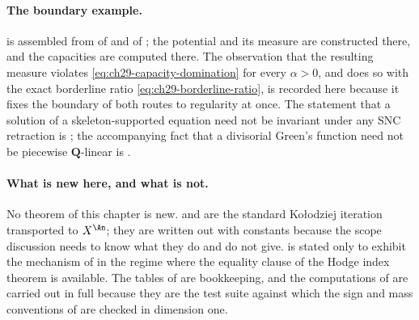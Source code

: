 \paragraph{The boundary example.}
 is assembled from
 of  and
 of ; the
potential and its measure are constructed there, and the capacities are
computed there.  The observation that the resulting measure violates
\eqref{eq:ch29-capacity-domination} for every $\alpha>0$, and does so with
the exact borderline ratio \eqref{eq:ch29-borderline-ratio}, is recorded
here because it fixes the boundary of both routes to regularity at once.
The statement that a solution of a skeleton-supported equation need not be
invariant under any SNC retraction is
\cite[Theorem~B]{BJGreen24}; the accompanying fact that a divisorial
Green's function need not be piecewise $\mathbf Q$-linear is
\cite[Theorem~A]{BJGreen24}.

\paragraph{What is new here, and what is not.}
No theorem of this chapter is new.   and
 are the standard Ko\l odziej iteration
transported to $X^{\An}$; they are written out with constants because the
scope discussion needs to know what they do and do not give.
 is stated only to exhibit the mechanism
of  in the regime where the equality clause of
the Hodge index theorem is available.  The tables of
 are bookkeeping, and the
computations of  are carried out in full because they
are the test suite against which the sign and mass conventions of
 are checked in dimension one.
